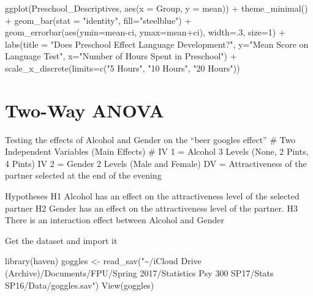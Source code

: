 \documentclass[
]{book}
\newenvironment{Shaded}{\begin{snugshade}}{\end{snugshade}}
\newcommand{\AttributeTok}[1]{\textcolor[rgb]{0.77,0.63,0.00}{#1}}
\newcommand{\DecValTok}[1]{\textcolor[rgb]{0.00,0.00,0.81}{#1}}
\newcommand{\FunctionTok}[1]{\textcolor[rgb]{0.00,0.00,0.00}{#1}}
\newcommand{\NormalTok}[1]{#1}
\newcommand{\OtherTok}[1]{\textcolor[rgb]{0.56,0.35,0.01}{#1}}
\newcommand{\SpecialCharTok}[1]{\textcolor[rgb]{0.00,0.00,0.00}{#1}}
\newcommand{\StringTok}[1]{\textcolor[rgb]{0.31,0.60,0.02}{#1}}
\begin{document}
\begin{Shaded}
\begin{Highlighting}[]
\FunctionTok{ggplot}\NormalTok{(Preschool\_Descriptives, }
       \FunctionTok{aes}\NormalTok{(}\AttributeTok{x =}\NormalTok{ Group,}
           \AttributeTok{y =}\NormalTok{ mean)) }\SpecialCharTok{+}
  \FunctionTok{theme\_minimal}\NormalTok{() }\SpecialCharTok{+}
  \FunctionTok{geom\_bar}\NormalTok{(}\AttributeTok{stat =} \StringTok{"identity"}\NormalTok{, }\AttributeTok{fill=}\StringTok{"steelblue"}\NormalTok{) }\SpecialCharTok{+}
  \FunctionTok{geom\_errorbar}\NormalTok{(}\FunctionTok{aes}\NormalTok{(}\AttributeTok{ymin=}\NormalTok{mean}\SpecialCharTok{{-}}\NormalTok{ci,}
                    \AttributeTok{ymax=}\NormalTok{mean}\SpecialCharTok{+}\NormalTok{ci), }\AttributeTok{width=}\NormalTok{.}\DecValTok{3}\NormalTok{, }\AttributeTok{size=}\DecValTok{1}\NormalTok{) }\SpecialCharTok{+}
  \FunctionTok{labs}\NormalTok{(}\AttributeTok{title =} \StringTok{"Does Preschool Effect Language Development?"}\NormalTok{, }
       \AttributeTok{y=}\StringTok{"Mean Score on Language Test"}\NormalTok{, }\AttributeTok{x=}\StringTok{"Number of Hours Spent in Preschool"}\NormalTok{) }\SpecialCharTok{+}
  \FunctionTok{scale\_x\_discrete}\NormalTok{(}\AttributeTok{limits=}\FunctionTok{c}\NormalTok{(}\StringTok{"5 Hours"}\NormalTok{, }\StringTok{"10 Hours"}\NormalTok{, }\StringTok{"20 Hours"}\NormalTok{))}
\end{Highlighting}
\end{Shaded}

\hypertarget{two-way-anova}{%
\chapter{Two-Way ANOVA}\label{two-way-anova}}

Testing the effects of Alcohol and Gender on the ``beer googles effect'' \#
Two Independent Variables (Main Effects) \#
IV 1 = Alcohol 3 Levels (None, 2 Pints, 4 Pints)
IV 2 = Gender 2 Levels (Male and Female)
DV = Attractiveness of the partner selected at the end of the evening

Hypotheses
H1 Alcohol has an effect on the attractiveness level of the selected partner
H2 Gender has an effect on the attractiveness level of the partner.
H3 There is an interaction effect between Alcohol and Gender

Get the dataset and import it

\begin{Shaded}
\begin{Highlighting}[]
\FunctionTok{library}\NormalTok{(haven)}
\NormalTok{goggles }\OtherTok{\textless{}{-}} \FunctionTok{read\_sav}\NormalTok{(}\StringTok{"\textasciitilde{}/iCloud Drive (Archive)/Documents/FPU/Spring 2017/Statistics Psy 300 SP17/Stats SP16/Data/goggles.sav"}\NormalTok{)}
\FunctionTok{View}\NormalTok{(goggles)}
\end{Highlighting}
\end{Shaded}
\end{document}
